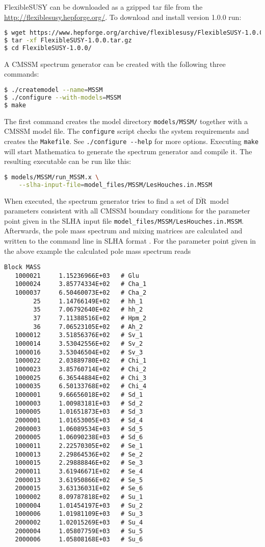 \documentclass[final,3p,11pt,pdflatex]{elsarticle}
\makeatletter
\newcommand{\fs}{FlexibleSUSY\@\xspace}
\newcommand{\mathematica}{Mathematica\xspace}
\newcommand{\code}[1]{\lstinline|#1|}  %
\newcommand{\textoverline}[1]{$\overline{\mbox{#1}}$}
\newcommand{\DRbar}{\textoverline{DR}\xspace}
\makeatother
\begin{document}
\fs can be downloaded as a gzipped tar file from the
\url{http://flexiblesusy.hepforge.org/}.  To download and install
version 1.0.0 run:
%
\begin{lstlisting}[language=bash]
$ wget https://www.hepforge.org/archive/flexiblesusy/FlexibleSUSY-1.0.0.tar.gz
$ tar -xf FlexibleSUSY-1.0.0.tar.gz
$ cd FlexibleSUSY-1.0.0/
\end{lstlisting}%
%
A CMSSM spectrum generator can be created with the following three
commands:
%
\begin{lstlisting}[language=bash]
$ ./createmodel --name=MSSM
$ ./configure --with-models=MSSM
$ make
\end{lstlisting}%
%
The first command creates the model directory \code{models/MSSM/}
together with a CMSSM model file.  The \code{configure} script checks
the system requirements and creates the \code{Makefile}.  See
\code{./configure --help} for more options.  Executing \code{make}
will start \mathematica to generate the spectrum generator and compile
it.  The resulting executable can be run like this:
%
\begin{lstlisting}[language=bash]
$ models/MSSM/run_MSSM.x \
    --slha-input-file=model_files/MSSM/LesHouches.in.MSSM
\end{lstlisting}%
%
When executed, the spectrum generator tries to find a set of \DRbar\
model parameters consistent with all CMSSM boundary conditions for the
parameter point given in the SLHA input file
\code{model_files/MSSM/LesHouches.in.MSSM}.  Afterwards, the pole mass
spectrum and mixing matrices are calculated and written to the command
line in SLHA format \cite{Skands:2003cj,Allanach:2008qq}.  For the
parameter point given in the above example the calculated pole mass
spectrum reads
%
\begin{lstlisting}
Block MASS
   1000021     1.15236966E+03   # Glu
   1000024     3.85774334E+02   # Cha_1
   1000037     6.50460073E+02   # Cha_2
        25     1.14766149E+02   # hh_1
        35     7.06792640E+02   # hh_2
        37     7.11388516E+02   # Hpm_2
        36     7.06523105E+02   # Ah_2
   1000012     3.51856376E+02   # Sv_1
   1000014     3.53042556E+02   # Sv_2
   1000016     3.53046504E+02   # Sv_3
   1000022     2.03889780E+02   # Chi_1
   1000023     3.85760714E+02   # Chi_2
   1000025     6.36544884E+02   # Chi_3
   1000035     6.50133768E+02   # Chi_4
   1000001     9.66656018E+02   # Sd_1
   1000003     1.00983181E+03   # Sd_2
   1000005     1.01651873E+03   # Sd_3
   2000001     1.01653005E+03   # Sd_4
   2000003     1.06089534E+03   # Sd_5
   2000005     1.06090238E+03   # Sd_6
   1000011     2.22570305E+02   # Se_1
   1000013     2.29864536E+02   # Se_2
   1000015     2.29888846E+02   # Se_3
   2000011     3.61946671E+02   # Se_4
   2000013     3.61950866E+02   # Se_5
   2000015     3.63136031E+02   # Se_6
   1000002     8.09787818E+02   # Su_1
   1000004     1.01454197E+03   # Su_2
   1000006     1.01981109E+03   # Su_3
   2000002     1.02015269E+03   # Su_4
   2000004     1.05807759E+03   # Su_5
   2000006     1.05808168E+03   # Su_6
\end{lstlisting}
\end{document}
